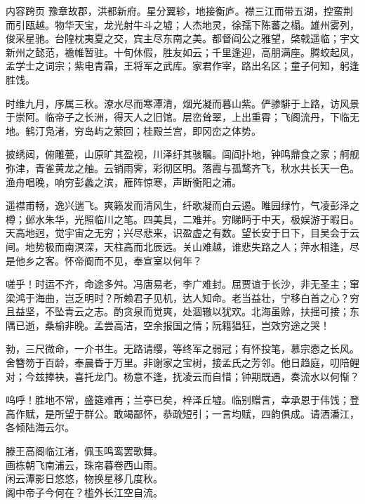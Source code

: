 \documentclass[aspectratio=169]{ctexbeamer} %
\begin{document}
\begin{frame}[allowframebreaks]{内容跨页}
  豫章故郡，洪都新府。星分翼轸，地接衡庐。襟三江而带五湖，控蛮荆而引瓯越。物华天宝，龙光射牛斗之墟；人杰地灵，徐孺下陈蕃之榻。雄州雾列，俊采星驰。台隍枕夷夏之交，宾主尽东南之美。都督阎公之雅望，棨戟遥临；宇文新州之懿范，襜帷暂驻。十旬休假，胜友如云；千里逢迎，高朋满座。腾蛟起凤，孟学士之词宗；紫电青霜，王将军之武库。家君作宰，路出名区；童子何知，躬逢胜饯。

  时维九月，序属三秋。潦水尽而寒潭清，烟光凝而暮山紫。俨骖騑于上路，访风景于崇阿。临帝子之长洲，得天人之旧馆。层峦耸翠，上出重霄；飞阁流丹，下临无地。鹤汀凫渚，穷岛屿之萦回；桂殿兰宫，即冈峦之体势。

  披绣闼，俯雕甍，山原旷其盈视，川泽纡其骇瞩。闾阎扑地，钟鸣鼎食之家；舸舰弥津，青雀黄龙之舳。云销雨霁，彩彻区明。落霞与孤鹜齐飞，秋水共长天一色。渔舟唱晚，响穷彭蠡之滨，雁阵惊寒，声断衡阳之浦。

  遥襟甫畅，逸兴遄飞。爽籁发而清风生，纤歌凝而白云遏。睢园绿竹，气凌彭泽之樽；邺水朱华，光照临川之笔。四美具，二难并。穷睇眄于中天，极娱游于暇日。天高地迥，觉宇宙之无穷；兴尽悲来，识盈虚之有数。望长安于日下，目吴会于云间。地势极而南溟深，天柱高而北辰远。关山难越，谁悲失路之人；萍水相逢，尽是他乡之客。怀帝阍而不见，奉宣室以何年？

  嗟乎！时运不齐，命途多舛。冯唐易老，李广难封。屈贾谊于长沙，非无圣主；窜梁鸿于海曲，岂乏明时？所赖君子见机，达人知命。老当益壮，宁移白首之心？穷且益坚，不坠青云之志。酌贪泉而觉爽，处涸辙以犹欢。北海虽赊，扶摇可接；东隅已逝，桑榆非晚。孟尝高洁，空余报国之情；阮籍猖狂，岂效穷途之哭！

  勃，三尺微命，一介书生。无路请缨，等终军之弱冠；有怀投笔，慕宗悫之长风。舍簪笏于百龄，奉晨昏于万里。非谢家之宝树，接孟氏之芳邻。他日趋庭，叨陪鲤对；今兹捧袂，喜托龙门。杨意不逢，抚凌云而自惜；钟期既遇，奏流水以何惭？

  呜呼！胜地不常，盛筵难再；兰亭已矣，梓泽丘墟。临别赠言，幸承恩于伟饯；登高作赋，是所望于群公。敢竭鄙怀，恭疏短引；一言均赋，四韵俱成。请洒潘江，各倾陆海云尔。

  \begin{center}
    滕王高阁临江渚，佩玉鸣鸾罢歌舞。\\
    画栋朝飞南浦云，珠帘暮卷西山雨。\\
    闲云潭影日悠悠，物换星移几度秋。\\
    阁中帝子今何在？槛外长江空自流。
  \end{center}
\end{frame}

\appendix
\end{document}
